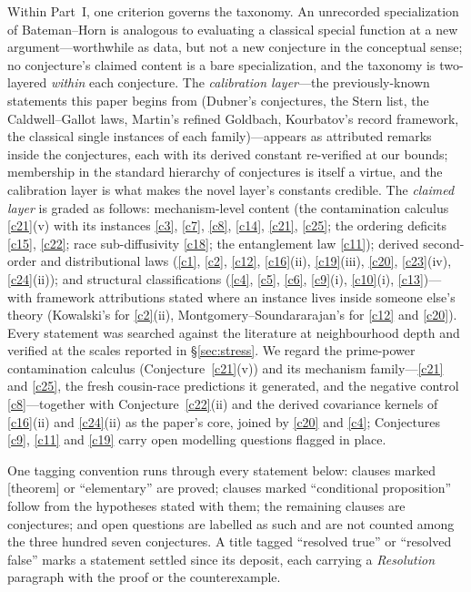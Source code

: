 \documentclass[11pt]{article}
\theoremstyle{definition}
\begin{document}
Within Part~I, one criterion governs the taxonomy.  An unrecorded specialization of
Bateman--Horn is analogous to evaluating a classical special function
at a new argument---worthwhile as data, but not a new conjecture in the
conceptual sense; no conjecture's claimed content is a bare specialization,
and the taxonomy is two-layered \emph{within} each conjecture.
The \emph{calibration layer}---the previously-known statements this
paper begins from (Dubner's conjectures, the Stern list, the
Caldwell--Gallot laws, Martin's refined Goldbach, Kourbatov's record
framework, the classical single instances of each family)---appears
as attributed remarks inside the conjectures, each with its derived
constant re-verified at our bounds; membership in the standard
hierarchy of conjectures is itself a virtue, and the calibration layer
is what makes the novel layer's constants credible.  The
\emph{claimed layer} is graded as follows: mechanism-level content
(the contamination calculus \ref{c21}(v) with its instances
\ref{c3}, \ref{c7}, \ref{c8}, \ref{c14}, \ref{c21}, \ref{c25}; the
ordering deficits \ref{c15}, \ref{c22}; race sub-diffusivity
\ref{c18}; the entanglement law \ref{c11}); derived second-order and
distributional laws (\ref{c1}, \ref{c2}, \ref{c12}, \ref{c16}(ii),
\ref{c19}(iii), \ref{c20}, \ref{c23}(iv), \ref{c24}(ii)); and
structural classifications (\ref{c4}, \ref{c5}, \ref{c6},
\ref{c9}(i), \ref{c10}(i), \ref{c13})---with framework attributions
stated where an instance lives inside someone else's theory
(Kowalski's for \ref{c2}(ii), Montgomery--Soundararajan's for
\ref{c12} and \ref{c20}).  Every statement was searched against the literature at neighbourhood depth and
verified at the scales reported in \S\ref{sec:stress}.  We
regard the
prime-power contamination calculus (Conjecture~\ref{c21}(v)) and its
mechanism family---\ref{c21} and \ref{c25}, the fresh cousin-race
predictions it generated, and the negative control
\ref{c8}---together with Conjecture~\ref{c22}(ii) and the derived
covariance kernels of \ref{c16}(ii) and \ref{c24}(ii) as the paper's
core, joined by \ref{c20} and \ref{c4}; Conjectures \ref{c9},
\ref{c11} and \ref{c19} carry open modelling questions flagged in
place.

One tagging convention runs through every statement below: clauses
marked [theorem] or ``elementary'' are proved; clauses marked
``conditional proposition'' follow from the hypotheses stated with
them; the remaining clauses are conjectures; and open questions are labelled as such and are not counted among the three hundred seven conjectures.  A title tagged ``resolved true'' or ``resolved false'' marks a statement settled since its deposit, each carrying a \emph{Resolution} paragraph with the proof or the counterexample.
\end{document}
